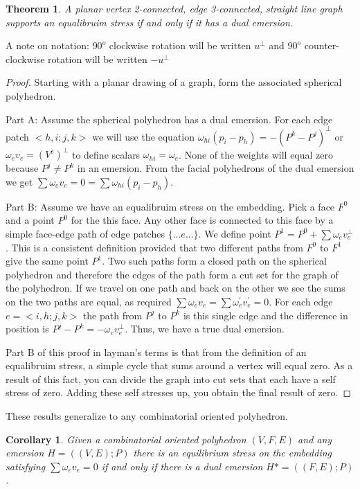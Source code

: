 \documentclass[11pt]{article}
\newtheorem{theorem}{Theorem}[section]
\newtheorem{corollary}{Corollary}[theorem]
\theoremstyle{definition}
\begin{document}
	\begin{theorem}
		A planar vertex 2-connected, edge 3-connected, straight line graph supports an equalibruim stress if and only if it has a dual emersion.
	\end{theorem}
	
	A note on notation: $90^o$ clockwise rotation will be written $u^\bot$ and $90^o$ counter-clockwise rotation will be written $-u^\bot$
	
	\begin{proof}
		Starting with a planar drawing of a graph, form the associated spherical polyhedron.
		
		Part A: Assume the spherical polyhedron has a dual emersion.
		For each edge patch $<h,i;j,k>$ we will use the equation $\omega_{hi}(p_i - p_h) = -(P^k - P^j)^\bot$ or $\omega_ev_e = (V^e)^\bot$ to define scalars $\omega_{hi} = \omega_e$. 
		None of the weights will equal zero because $P^j \neq P^k$ in an emersion. 
		From the facial polyhedrons of the dual emersion we get $\sum\omega_ev_e = 0 = \sum\omega_{hi}(p_i - p_h)$.

		Part B: Assume we have an equalibruim stress on the embedding.
		Pick a face $F^0$ and a point $P^0$ for the this face. 
		Any other face is connected to this face by a simple face-edge path of edge patches $\{...e...\}$. 
		We define point $P^1 = P^0 + \sum\omega_ev_e^\bot$. 
		This is a consistent definition provided that two different paths from $F^0$ to $F^1$ give the same point $P^1$. 
		Two such paths form a closed path on the spherical polyhedron and therefore the edges of the path form a cut set for the graph of the polyhedron. 
		If we travel on one path and back on the other we see the sums on the two paths are equal, as required $\sum\omega_ev_e = \sum\omega_e^{'}v_e^{'} = 0$. 
		For each edge $e = <i,h;j,k>$ the path from $P^j$ to $P^k$ is this single edge and the difference in position is $P^j - P^k = -\omega_ev_e^\bot$. 
		Thus, we have a true dual emersion.

		Part B of this proof in layman's terms is that from the definition of an equalibruim stress, a simple cycle that sums around a vertex will equal zero. 
		As a result of this fact, you can divide the graph into cut sets that each have a self stress of zero. 
		Adding these self stresses up, you obtain the final result of zero.
	\end{proof}
	
	These results generalize to any combinatorial oriented polyhedron.
	
	\begin{corollary} 
		Given a combinatorial oriented polyhedron $(V,F,E)$ and any emersion $H = ((V,E);P)$ there is an equilibrium stress on the embedding satisfying $\sum \omega_ev_e = 0$ if and only if there is a dual emersion $H* = ((F,E);P)$. 
	\end{corollary}
\end{document}
